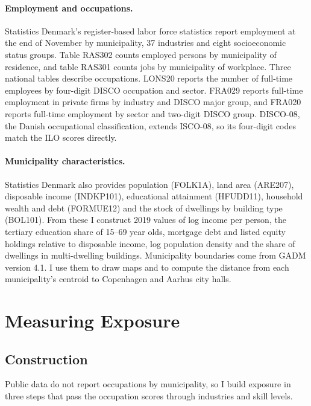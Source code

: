\documentclass[12pt]{article}
\begin{document}
\paragraph{Employment and occupations.} Statistics Denmark's register-based labor force statistics report employment at the end of November by municipality, 37 industries and eight socioeconomic status groups. Table RAS302 counts employed persons by municipality of residence, and table RAS301 counts jobs by municipality of workplace. Three national tables describe occupations. LONS20 reports the number of full-time employees by four-digit DISCO occupation and sector. FRA029 reports full-time employment in private firms by industry and DISCO major group, and FRA020 reports full-time employment by sector and two-digit DISCO group. DISCO-08, the Danish occupational classification, extends ISCO-08, so its four-digit codes match the ILO scores directly.

\paragraph{Municipality characteristics.} Statistics Denmark also provides population (FOLK1A), land area (ARE207), disposable income (INDKP101), educational attainment (HFUDD11), household wealth and debt (FORMUE12) and the stock of dwellings by building type (BOL101). From these I construct 2019 values of log income per person, the tertiary education share of 15--69 year olds, mortgage debt and listed equity holdings relative to disposable income, log population density and the share of dwellings in multi-dwelling buildings. Municipality boundaries come from GADM version 4.1. I use them to draw maps and to compute the distance from each municipality's centroid to Copenhagen and Aarhus city halls.

\section{Measuring Exposure}\label{sec:exposure}

\subsection{Construction}

Public data do not report occupations by municipality, so I build exposure in three steps that pass the occupation scores through industries and skill levels.
\end{document}
